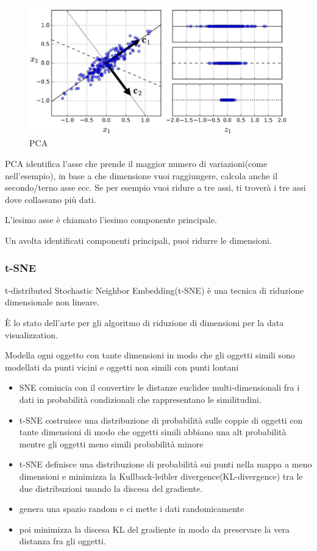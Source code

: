 \begin{figure}[H]
    \centering
    \includegraphics[width=0.5\linewidth]{imgs/pca}
    \caption{PCA}
    \label{fig:PCA}
\end{figure}
PCA identifica l'asse che prende il maggior numero di variazioni(come nell'esempio),
in base a che dimensione vuoi raggiungere, calcola anche il secondo/terno asse ecc.
Se per esempio vuoi ridure a tre assi, ti troverà i tre assi dove collassano più dati.


L'iesimo asse è chiamato l'iesimo componente principale.

Un avolta identificati componenti principali, puoi ridurre le dimensioni.

\subsubsection{t-SNE}
t-distributed Stochastic Neighbor Embedding(t-SNE) è una tecnica di riduzione
dimensionale non lineare.

È lo stato dell'arte per gli algoritmo di riduzione di dimensioni per la data
visualizzation.


Modella ogni oggetto con tante dimensioni in modo che gli oggetti simili sono
modellati da punti vicini e oggetti non simili con punti lontani


\begin{itemize}
    \item SNE comincia con il convertire le distanze euclidee multi-dimensionali fra
    i dati in probabilità condizionali che rappresentano le similitudini.
    \item t-SNE costruisce una distribuzione di probabilità sulle coppie di oggetti con tante
    dimensioni di modo che oggetti simili abbiano una alt probabilità mentre gli oggetti
    meno simili probabilità minore
    \item t-SNE definisce una distribuzione di probabilità sui punti nella mappa a meno dimensioni
    e minimizza la Kullback-leibler divergence(KL-divergence) tra le due distribuzioni usando
    la discesa del gradiente.
    \item genera una spazio random e ci mette i dati randomicamente
    \item poi minimizza la discesa KL del gradiente in modo da preservare la vera distanza
    fra gli oggetti.
\end{itemize}



